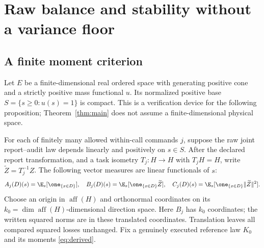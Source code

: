 \section{Raw balance and stability without a variance floor}
\subsection*{A finite moment criterion}
Let $E$ be a finite-dimensional real ordered space with generating positive cone and a strictly positive mass functional $u$. Its normalized positive base $S=\{s\ge0:u(s)=1\}$ is compact. This is a verification device for the following proposition; Theorem~\ref{thm:main} does not assume a finite-dimensional physical space.

For each of finitely many allowed within-call commands $j$, suppose the raw joint report--audit law depends linearly and positively on $s\in S$. After the declared report transformation, and a task isometry $T_j:H\to H$ with $T_jH=H$, write $\widetilde Z=T_j^{-1}Z$. The following vector measures are linear functionals of $s$:
\[
 A_j(D)(s)=\E_s[\one_{\{x\in D\}}],\quad
 B_j(D)(s)=\E_s[\one_{\{x\in D\}}\widetilde Z],\quad
 C_j(D)(s)=\E_s[\one_{\{x\in D\}}\|\widetilde Z\|^2].
\]
Choose an origin in $\operatorname{aff}(H)$ and orthonormal coordinates on its $k_0=\dim\operatorname{aff}(H)$-dimensional direction space. Here $B_j$ has $k_0$ coordinates; the written squared norms are in these translated coordinates. Translation leaves all compared squared losses unchanged. Fix a genuinely executed reference law $K_0$ and its moments \eqref{eq:derived}.

